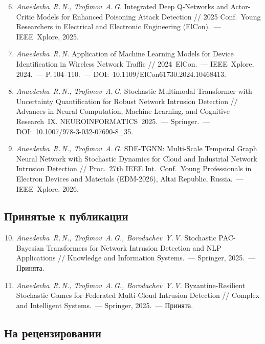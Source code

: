 \documentclass[12pt,a5paper]{article}
\begin{document}
\begin{enumerate}
\setcounter{enumi}{5}
\item \textit{Anaedevha~R.\,N., Trofimov~A.\,G.} Integrated
Deep Q-Networks and Actor-Critic Models for Enhanced
Poisoning Attack Detection // 2025 Conf.\ Young Researchers
in Electrical and Electronic Engineering (ElCon).~---
IEEE~Xplore, 2025.

\item \textit{Anaedevha~R.\,N.} Application of Machine
Learning Models for Device Identification in Wireless
Network Traffic // 2024~ElCon.~--- IEEE~Xplore, 2024.~---
P.\,104--110.~--- DOI:~10.1109/ElCon61730.2024.10468413.

\item \textit{Anaedevha~R.\,N., Trofimov~A.\,G.} Stochastic
Multimodal Transformer with Uncertainty Quantification for
Robust Network Intrusion Detection // Advances in Neural
Computation, Machine Learning, and Cognitive Research~IX.
NEUROINFORMATICS~2025.~--- Springer.~---
DOI:~10.1007/978-3-032-07690-8\_35.

\item \textit{Anaedevha~R.\,N., Trofimov~A.\,G.}
SDE-TGNN: Multi-Scale Temporal Graph Neural Network with
Stochastic Dynamics for Cloud and Industrial Network
Intrusion Detection // Proc.\ 27th IEEE Int.\ Conf.\ Young
Professionals in Electron Devices and Materials
(EDM-2026), Altai Republic, Russia.~--- IEEE~Xplore, 2026.
\end{enumerate}

\subsection*{Принятые к публикации}

\begin{enumerate}
\setcounter{enumi}{9}
\item \textit{Anaedevha~R.\,N., Trofimov~A.\,G., Borodachev~Y.\,V.}
Stochastic PAC-Bayesian Transformers for Network Intrusion
Detection and NLP Applications // Knowledge and
Information Systems.~--- Springer, 2025.~--- Принята.

\item \textit{Anaedevha~R.\,N., Trofimov~A.\,G., Borodachev~Y.\,V.}
Byzantine-Resilient Stochastic Games for Federated
Multi-Cloud Intrusion Detection // Complex and Intelligent
Systems.~--- Springer, 2025.~--- Принята.
\end{enumerate}

\subsection*{На рецензировании}
\end{document}
